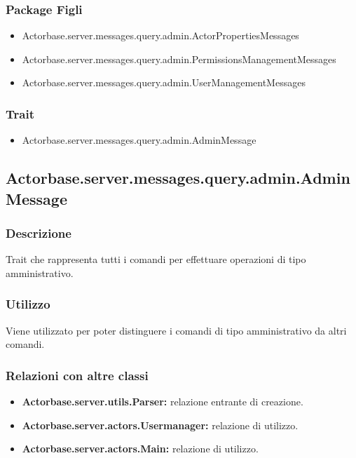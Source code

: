 \documentclass[a4paper]{article}
\begin{document}
			\subsubsection{Package Figli}
				\begin{itemize}
					\item Actorbase.server.messages.query.admin.ActorPropertiesMessages
					\item Actorbase.server.messages.query.admin.PermissionsManagementMessages
					\item Actorbase.server.messages.query.admin.UserManagementMessages
				\end{itemize}
				
			\subsubsection{Trait}
				\begin{itemize}
					\item Actorbase.server.messages.query.admin.AdminMessage
				\end{itemize}
				
		\subsection{Actorbase.server.messages.query.admin.AdminMessage}
			\subsubsection{Descrizione}
				Trait che rappresenta tutti i comandi per effettuare operazioni di tipo amministrativo.
				
			\subsubsection{Utilizzo}
				Viene utilizzato per poter distinguere i comandi di tipo amministrativo da altri comandi.
				
			\subsubsection{Relazioni con altre classi}
				\begin{itemize}
					\item \textbf{Actorbase.server.utils.Parser:} relazione entrante di creazione.
					\item \textbf{Actorbase.server.actors.Usermanager:} relazione di utilizzo.
					\item \textbf{Actorbase.server.actors.Main:} relazione di utilizzo.
				\end{itemize}
\end{document}
